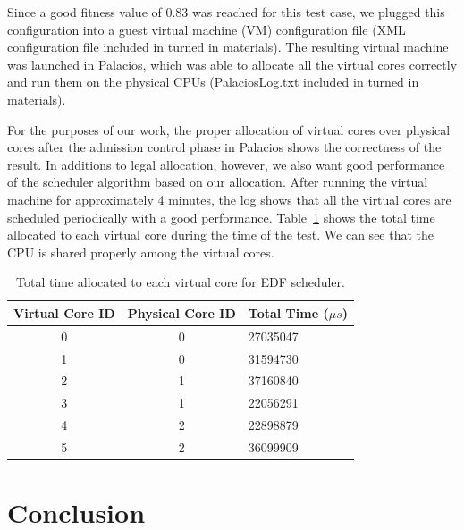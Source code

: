 \documentclass[11pt]{article}
\begin{document}
Since a good fitness value of 0.83 was reached for this test case, we plugged this configuration into a guest virtual machine (VM) configuration file (XML configuration file included in turned in materials). The resulting virtual machine was launched in Palacios, which was able to allocate all the virtual cores correctly and run them on the physical CPUs (PalaciosLog.txt included in turned in materials). 

For the purposes of our work, the proper allocation of virtual cores over physical cores after the admission control phase in Palacios shows the correctness of the result. In additions to legal allocation, however, we also want good performance of the scheduler algorithm based on our allocation. After running the virtual machine for approximately 4 minutes, the log shows that all the virtual cores are scheduled periodically with a good performance. Table~\ref{tab:table2} shows the total time allocated to each virtual core during the time of the test. We can see that the CPU is shared properly among the virtual cores.

\begin{table}[H]
\centering
\renewcommand{\arraystretch}{1.2}

 \begin{tabularx}{275pt}{ | c | c | X | }
 \hline
Virtual Core ID & Physical Core ID & Total Time ($\mu$$s$) \\ \hline

0 & 0 & 27035047 \\ \hline

1 & 0 & 31594730 \\ \hline

2 & 1 & 37160840 \\ \hline

3 & 1 & 22056291 \\ \hline

4 & 2 & 22898879 \\ \hline

5 & 2 & 36099909 \\ \hline

\end{tabularx}
\caption{Total time allocated to each virtual core for EDF scheduler.}
 \label{tab:table2}
\end{table}

\section{Conclusion}
\end{document}
